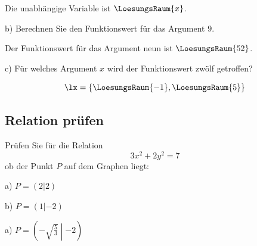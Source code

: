 Die unabhängige Variable ist $\LoesungsRaum{x}$.
\vspace{5mm}

b) Berechnen Sie den Funktionswert für das Argument $9$.
\vspace{5mm}

Der Funktionswert für das Argument neun ist $\LoesungsRaum{52}$.



c) Für welches Argument $x$ wird der Funktionswert zwölf getroffen?

$$\lx = \{\LoesungsRaum{-1}, \LoesungsRaum{5}\}$$


\subsection{Relation prüfen}
Prüfen Sie für die Relation $$3x^2 + 2y^2 = 7$$ ob der Punkt $P$ auf
dem Graphen liegt:

a) $P=(2|2)$  

\vspace{5mm}
b) $P=(1|-2)$  

\vspace{5mm}
a) $P=\left(-\sqrt{\frac{5}{3}}\middle | -2\right)$  

\vspace{5mm}




